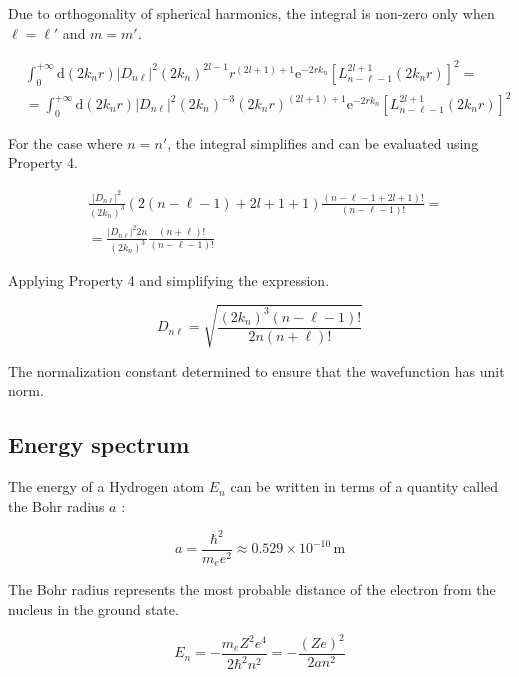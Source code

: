 \documentclass[italian]{HKNdocument}
\begin{document}
Due to orthogonality of spherical harmonics, the integral is non-zero only when $\ell=\ell'$ and $m=m'$.

\begin{align}
& \int_{0}^{+\infty} \mathrm{d}\left(2 k_{n} r\right)\left|D_{n \ell}\right|^{2}\left(2 k_{n}\right)^{2 l-1} r^{(2 l+1)+1} \mathrm{e}^{-2 r k_{n}}\left[L_{n-\ell-1}^{2 l+1}\left(2 k_{n} r\right)\right]^{2}= \\
& =\int_{0}^{+\infty} \mathrm{d}\left(2 k_{n} r\right)\left|D_{n \ell}\right|^{2}\left(2 k_{n}\right)^{-3}\left(2 k_{n} r\right)^{(2 l+1)+1} \mathrm{e}^{-2 r k_{n}}\left[L_{n-\ell-1}^{2 l+1}\left(2 k_{n} r\right)\right]^{2} \label{eq:9.82}
\end{align}

For the case where $n=n'$, the integral simplifies and can be evaluated using Property 4.

\begin{align}
& \frac{\left|D_{n \ell}\right|^{2}}{\left(2 k_{n}\right)^{3}}(2(n-\ell-1)+2 l+1+1) \frac{(n-\ell-1+2 l+1)!}{(n-\ell-1)!}=  \label{eq:9.83}\\
& =\frac{\left|D_{n \ell}\right|^{2} 2 n}{\left(2 k_{n}\right)^{3}} \frac{(n+\ell)!}{(n-\ell-1)!}
\end{align}

Applying Property 4 and simplifying the expression.

\begin{equation}
D_{n \ell}=\sqrt{\frac{\left(2 k_{n}\right)^{3}(n-\ell-1)!}{2 n(n+\ell)!}} \label{eq:9.84}
\end{equation}

The normalization constant determined to ensure that the wavefunction has unit norm.

\subsection{Energy spectrum}
The energy of a Hydrogen atom $E_{n}$ can be written in terms of a quantity called the Bohr radius $a$ :

\begin{equation}
a=\frac{\hbar^{2}}{m_{e} e^{2}} \approx 0.529 \times 10^{-10} \, \mathrm{m} \label{eq:9.85}
\end{equation}

The Bohr radius represents the most probable distance of the electron from the nucleus in the ground state.

\begin{equation}
E_{n}=-\frac{m_{e} Z^{2} e^{4}}{2 \hbar^{2} n^{2}}=-\frac{(Z e)^{2}}{2 a n^{2}} \label{eq:9.86}
\end{equation}
\end{document}
